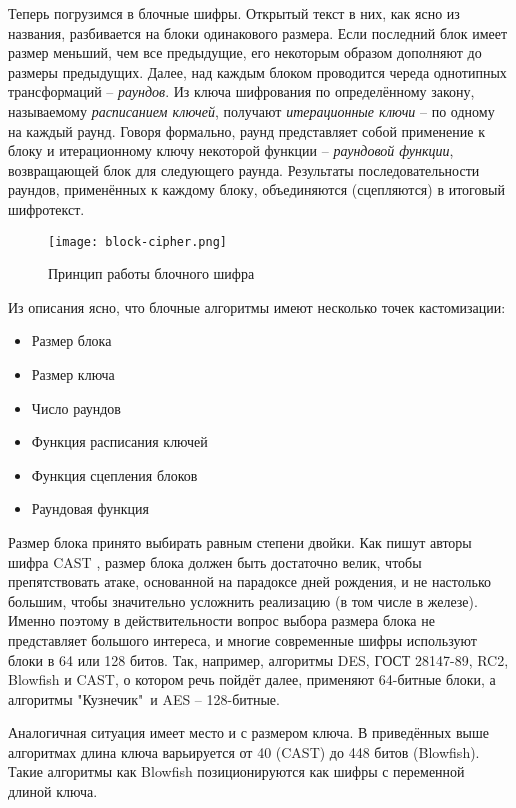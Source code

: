 \documentclass[12pt, a4paper, reqno]{article}
\begin{document}
    Теперь погрузимся в блочные шифры. Открытый текст в них, как ясно из названия, разбивается на
    блоки одинакового размера. Если последний блок имеет размер меньший, чем все предыдущие, его
    некоторым образом дополняют до размеры предыдущих. Далее, над каждым блоком проводится череда
    однотипных трансформаций -- \textit{раундов}. Из ключа шифрования по определённому закону,
    называемому \textit{расписанием ключей}, получают \textit{итерационные ключи} -- по одному на
    каждый раунд. Говоря формально, раунд представляет собой применение к блоку и итерационному
    ключу некоторой функции -- \textit{раундовой функции}, возвращающей блок для следующего раунда.
    Результаты последовательности раундов, применённых к каждому блоку, объединяются (сцепляются) в
    итоговый шифротекст.

    \begin{figure}[H]
        \centering
        \texttt{[image: block-cipher.png]}
        \caption{Принцип работы блочного шифра}
    \end{figure}

    Из описания ясно, что блочные алгоритмы имеют несколько точек кастомизации:
    \begin{itemize}
        \item Размер блока
        \item Размер ключа
        \item Число раундов
        \item Функция расписания ключей
        \item Функция сцепления блоков
        \item Раундовая функция
    \end{itemize}

    Размер блока принято выбирать равным степени двойки. Как пишут авторы шифра CAST \cite{cast},
    размер блока должен быть достаточно велик, чтобы препятствовать атаке, основанной на парадоксе
    дней рождения, и не настолько большим, чтобы значительно усложнить реализацию (в том числе в
    железе). Именно поэтому в действительности вопрос выбора размера блока не представляет большого
    интереса, и многие современные шифры используют блоки в 64 или 128 битов. Так, например,
    алгоритмы DES, ГОСТ 28147-89, RC2, Blowfish и CAST, о котором речь пойдёт далее, применяют
    64-битные блоки, а алгоритмы "Кузнечик"\ и AES -- 128-битные.

    Аналогичная ситуация имеет место и с размером ключа. В приведённых выше алгоритмах длина ключа
    варьируется от 40 (CAST) до 448 битов (Blowfish). Такие алгоритмы как Blowfish позиционируются
    как шифры с переменной длиной ключа.
\end{document}
